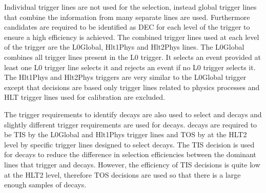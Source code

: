 Individual trigger lines are not used for the selection, instead global trigger lines that combine the information from many separate lines are used. Furthermore candidates are required to be identified as DEC for each level of the trigger to ensure a high efficiency is achieved. The combined trigger lines used at each level of the trigger are the L0Global, Hlt1Phys and Hlt2Phys lines. 
The L0Global combines all trigger lines present in the L0 trigger. It selects an event provided at least one L0 trigger line selects it and rejects an event if no L0 trigger selects it. The Hlt1Phys and Hlt2Phys triggers are very similar 
to the L0Global trigger except that decisions are based only trigger lines related to physics processes and HLT trigger lines used
 for calibration are excluded.


The trigger requirements to identify \bmumu decays are also used to select \bujpsik and \bsjpsiphi decays and slightly different trigger requirements are used for \bhh decays. \bhh decays are required to be TIS by the L0Global and Hlt1Phys trigger lines and TOS by at the HLT2 level by specific trigger lines designed to select \bhh decays. The TIS decision is used for \bhh decays to reduce the difference in selection efficiencies between the dominant lines that trigger \bhh and \bmumu decays. However, the efficiency of TIS decisions is quite low at the HLT2 level, therefore TOS decisions are used so that there is a large enough samples of decays. %


